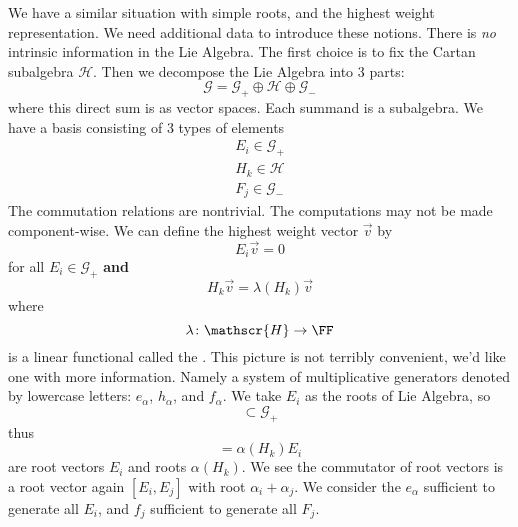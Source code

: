 We have a similar situation with simple roots, and the highest
weight representation. We need additional data to introduce
these notions. There is \emph{no} intrinsic information in the
Lie Algebra. The first choice is to fix the Cartan subalgebra
$\mathscr{H}$. Then we decompose the Lie Algebra into 3 parts:
\begin{equation}
\mathscr{G}=\mathscr{G}_{+}\oplus\mathscr{H}\oplus\mathscr{G}_{-}
\end{equation}
where this direct sum is as vector spaces. Each summand is a
subalgebra. We have a basis consisting of 3 types of elements
\begin{subequations}
\begin{align}
E_{i}\in\mathscr{G}_{+}\\
H_{k}\in\mathscr{H}\\
F_{j}\in\mathscr{G}_{-}
\end{align}
\end{subequations}
The commutation relations are nontrivial. The computations may
not be made component-wise. We can define the highest weight
vector $\vec{v}$ by
\begin{equation}
E_{i}\vec{v}=0
\end{equation}
for all $E_{i}\in\mathscr{G}_{+}$ \textbf{and}
\begin{equation}
H_{k}\vec{v}=\lambda(H_{k})\vec{v}
\end{equation}
where
\begin{equation}
\lambda\colon\mathscr{H}\to\FF
\end{equation}
is a linear functional called the . This
picture is not terribly convenient, we'd like one with more
information. Namely a system of multiplicative generators denoted
by lowercase letters: $e_{\alpha}$, $h_{\alpha}$, and
$f_{\alpha}$. We take $E_{i}$ as the roots of Lie Algebra, so
\begin{equation}
[H,\mathscr{G}_{+}]\subset\mathscr{G}_{+}
\end{equation}
thus
\begin{equation}
[H_{k},E_{i}] = \alpha(H_{k})E_{i}
\end{equation}
are root vectors $E_{i}$ and roots $\alpha(H_{k})$. We see the
commutator of root vectors is a root vector again
$[E_{i},E_{j}]$ with root $\alpha_{i}+\alpha_{j}$. We consider
the $e_{\alpha}$ sufficient to generate all $E_{i}$, and $f_{j}$
sufficient to generate all $F_{j}$.
